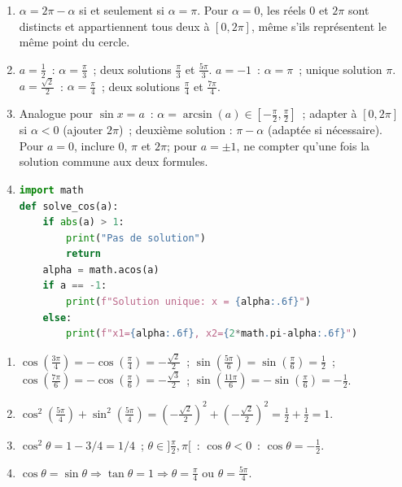 
\begin{enumerate}
  \item $\alpha=2\pi-\alpha$ si et seulement si $\alpha=\pi$.
        Pour $\alpha=0$, les r\'eels $0$ et $2\pi$ sont distincts et
        appartiennent tous deux \`a $[0,2\pi]$, m\^eme s'ils repr\'esentent
        le m\^eme point du cercle.
  \item $a=\frac{1}{2}$~: $\alpha=\frac{\pi}{3}$~; deux solutions $\frac{\pi}{3}$ et $\frac{5\pi}{3}$.
        $a=-1$~: $\alpha=\pi$~; unique solution $\pi$.
        $a=\frac{\sqrt{2}}{2}$~: $\alpha=\frac{\pi}{4}$~; deux solutions $\frac{\pi}{4}$ et $\frac{7\pi}{4}$.
  \item Analogue pour $\sin x=a$~: $\alpha=\arcsin(a)\in[-\frac{\pi}{2},\frac{\pi}{2}]$~;
        adapter \`a $[0,2\pi]$ si $\alpha<0$ (ajouter $2\pi$)~;
        deuxi\`eme solution : $\pi-\alpha$ (adapt\'ee si n\'ecessaire).
        Pour $a=0$, inclure $0$, $\pi$ et $2\pi$; pour $a=\pm1$,
        ne compter qu'une fois la solution commune aux deux formules.
  \item
\begin{lstlisting}[language=Python]
import math
def solve_cos(a):
    if abs(a) > 1:
        print("Pas de solution")
        return
    alpha = math.acos(a)
    if a == -1:
        print(f"Solution unique: x = {alpha:.6f}")
    else:
        print(f"x1={alpha:.6f}, x2={2*math.pi-alpha:.6f}")
\end{lstlisting}
\end{enumerate}


\begin{enumerate}
  \item $\cos(\frac{3\pi}{4})=-\cos(\frac{\pi}{4})=-\frac{\sqrt{2}}{2}$~;
        $\sin(\frac{5\pi}{6})=\sin(\frac{\pi}{6})=\frac{1}{2}$~;
        $\cos(\frac{7\pi}{6})=-\cos(\frac{\pi}{6})=-\frac{\sqrt{3}}{2}$~;
        $\sin(\frac{11\pi}{6})=-\sin(\frac{\pi}{6})=-\frac{1}{2}$.
  \item $\cos^2(\frac{5\pi}{4})+\sin^2(\frac{5\pi}{4})=(-\frac{\sqrt{2}}{2})^2+(-\frac{\sqrt{2}}{2})^2=\frac{1}{2}+\frac{1}{2}=1$.\checkmark
  \item $\cos^2\theta=1-3/4=1/4$~; $\theta\in]\frac{\pi}{2},\pi[$~: $\cos\theta<0$~: $\cos\theta=-\frac{1}{2}$.
  \item $\cos\theta=\sin\theta\Rightarrow\tan\theta=1\Rightarrow\theta=\frac{\pi}{4}$ ou $\theta=\frac{5\pi}{4}$.
\end{enumerate}

